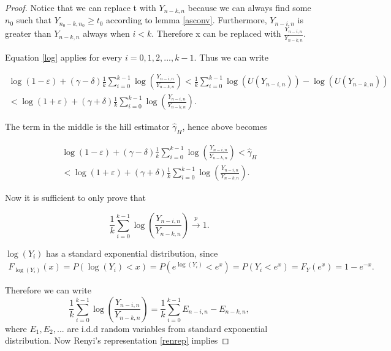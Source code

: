 \documentclass[english,12pt,a4paper,pdftex,sci,utf8]{aaltothesis} %
\begin{document}
\begin{proof}
Notice that we can replace t with $Y_{n-k,n}$ because we can always find some $n_0$ such that $Y_{n_0-k,n_0} \geq t_0$ according to lemma \ref{asconv}. Furthermore, $Y_{n-i,n}$ is greater than $Y_{n-k,n}$ always when $i<k$. Therefore x can be replaced with $\frac{Y_{n-i,n}}{Y_{n-k,n}}$.

Equation \ref{log} applies for every $i = 0,1,2,..., k-1$. Thus we can write

\begin{equation}
\begin{split}
\log(1 - \varepsilon) + (\gamma - \delta) \frac{1}{k} \sum_{i=0}^{k-1} \log(\frac{Y_{n-i,n}}{Y_{n-k,n}}) < \frac{1}{k} \sum_{i=0}^{k-1} \log(U(Y_{n-i,n})) - \log(U(Y_{n-k,n})) \\
< \log(1 + \varepsilon) + (\gamma + \delta) \frac{1}{k} \sum_{i=0}^{k-1} \log(\frac{Y_{n-i,n}}{Y_{n-k,n}}).
\end{split}
\end{equation}

The term in the middle is the hill estimator $\hat{\gamma}_H$, hence above becomes

\begin{equation}
\begin{split}
\log(1 - \varepsilon) + (\gamma - \delta) \frac{1}{k} \sum_{i=0}^{k-1} \log(\frac{Y_{n-i,n}}{Y_{n-k,n}}) < \hat{\gamma}_H \\
< \log(1 + \varepsilon) + (\gamma + \delta) \frac{1}{k} \sum_{i=0}^{k-1} \log(\frac{Y_{n-i,n}}{Y_{n-k,n}}).
\end{split}
\end{equation}

Now it is sufficient to only prove that 

\begin{equation}
\frac{1}{k} \sum_{i=0}^{k-1} \log(\frac{Y_{n-i,n}}{Y_{n-k,n}}) \xrightarrow{p} 1.
\end{equation}

$\log(Y_i)$ has a standard exponential distribution, since 
\begin{equation*}
\begin{split}
F_{\log(Y_i)}(x) = P(\log(Y_i) < x) = P(e^{\log(Y_i)} < e^x) = P(Y_i < e^x) = F_Y(e^x) = 1 - {e^{-x}}.
\end{split}
\end{equation*}

Therefore we can write
\begin{equation}
\frac{1}{k} \sum_{i=0}^{k-1} \log(\frac{Y_{n-i,n}}{Y_{n-k,n}}) = \frac{1}{k} \sum_{i=0}^{k-1} E_{n-i,n} - E_{n-k,n},
\label{kesk}
\end{equation}
where $E_1, E_2,...$ are i.d.d random variables from standard exponential distribution. Now Renyi's representation \ref{renrep} implies


\end{proof}
\end{document}
